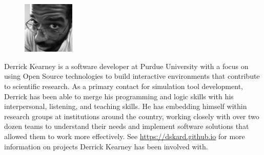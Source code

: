 \documentclass[letterpaper]{article}
\begin{document}
\begin{figure}
  \vspace{-10pt}
  \begin{center}
    \includegraphics[width=0.22\textwidth]{images/avatar_2inX2in.jpeg}
  \end{center}
  \vspace{-20pt}
\end{figure}

\noindent
Derrick Kearney is a software developer at Purdue University with a focus on
using Open Source technologies to build interactive environments that
contribute to scientific research. As a primary contact for simulation tool
development, Derrick has been able to merge his programming and logic skills
with his interpersonal, listening, and teaching skills. He has embedding
himself within research groups at institutions around the country, working
closely with over two dozen teams to understand their needs and implement
software solutions that allowed them to work more effectively. See
\url{https://dskard.github.io} for more information on projects Derrick Kearney has
been involved with.

\end{document}
